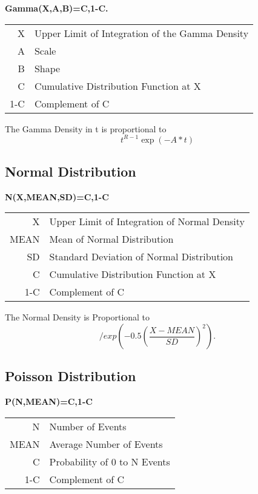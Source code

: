 \documentclass[12pt,dvips]{article}
\newcommand{\mysubsection}[1]
    {\color{green}\subsection{#1}\color{black}}
\begin{document}
{\bf \centering Gamma(X,A,B)=C,1-C.\\}

\begin{center}
\begin{tabular}{rl}
         X  & Upper Limit of Integration of the Gamma Density\\
         A  & Scale\\
         B  & Shape\\
         C  & Cumulative Distribution Function at X\\
       1-C  & Complement of C\\
\end{tabular}
\end{center}
     
     The Gamma Density in t is proportional to
\[ t^{R-1}  \exp(-A*t) \] 
     
     
\mysubsection{Normal Distribution}
     
{\bf \centering N(X,MEAN,SD)=C,1-C\\}

\begin{center}
\begin{tabular}{rl}
        X    & Upper Limit of Integration of Normal Density\\
        MEAN & Mean of Normal Distribution\\
        SD   & Standard Deviation of Normal Distribution\\
        C    & Cumulative Distribution Function at X\\
        1-C  & Complement of C\\
\end{tabular}
\end{center}
     
     The Normal Density is Proportional to
\[     /exp( - 0.5  (\frac{X-MEAN}{SD})^2). \] 

     
     
\mysubsection{Poisson Distribution}

{\bf \centering P(N,MEAN)=C,1-C\\}

\begin{center}
\begin{tabular}{rl}
        N    & Number of Events\\
        MEAN & Average Number of Events\\
        C    & Probability of 0 to N Events\\
        1-C  & Complement of C\\
\end{tabular}
\end{center}
\end{document}
